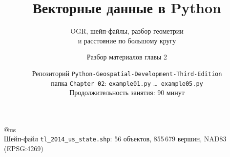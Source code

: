 \documentclass[aspectratio=169,10pt]{beamer}
\title[Глава 2. Векторные данные в Python]{\textbf{Векторные данные в Python}}
\subtitle{OGR, шейп-файлы, разбор геометрии\\ и расстояние по большому кругу}
\author{Разбор материалов главы 2}
\date{Репозиторий \texttt{Python-Geospatial-Development-Third-Edition}\\
      \small папка \texttt{Chapter 02}: \texttt{example01.py} \ldots\ \texttt{example05.py}\\
      \small Продолжительность занятия: 90 минут}
\makeatletter
\newcommand{\usePic}[1]{\expandafter\csname pic@#1\endcsname}
\makeatother
\begin{document}
\begin{frame}[plain]
  \vspace{0.3cm}
  \begin{center}
    {\LARGE\bfseries \inserttitle\par}
    \vspace{0.2cm}
    {\large \insertsubtitle\par}
  \end{center}
  \vskip0.2cm
  \begin{center}
    \usePic{us}\\[-0.1cm]
    {\footnotesize Шейп-файл \texttt{tl\_2014\_us\_state.shp}: 56 объектов,
      855\,679 вершин, NAD83 (EPSG:4269)}
  \end{center}
  \vfill
  \begin{center}\small\insertauthor\\[0.3em]\insertdate\end{center}
\end{frame}
\end{document}

